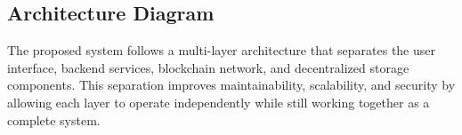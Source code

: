 \subsection{Architecture Diagram}

The proposed system follows a multi-layer architecture that separates the user interface, backend services, blockchain network, and decentralized storage components. This separation improves maintainability, scalability, and security by allowing each layer to operate independently while still working together as a complete system.







